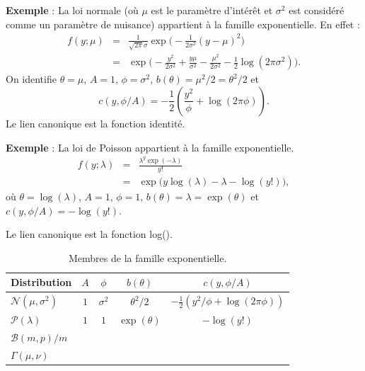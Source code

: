 \documentclass{BeamerTemplate}
\begin{document}
\begin{refsection}
\begin{frame}{}
\textbf{Exemple} : La {\color{blue} loi normale} (où $\mu$ est le
paramètre d'intérêt et $\sigma^2$ est considéré comme un paramètre de
nuisance)  appartient à la famille
exponentielle. En effet :
\begin{eqnarray*}
  f(y; \mu) & = & \frac{1}{\sqrt{2\pi}\sigma} \exp\big(-\frac{1}{2
  \sigma^2}(y-\mu)^2\big)\\
& = & \exp \big( -\frac{y^2}{2 \sigma^2} + \frac{y \mu}{\sigma^2} - \frac{\mu^2}{2 \sigma^2} - \frac{1}{2} \log(2 \pi \sigma^2) \big).
\end{eqnarray*}
On identifie $\theta=\mu$, $A=1$, $\phi=\sigma^ 2$, $b(\theta) = \mu^2/2=
\theta^2/2$ et
$$c(y,\phi/A) = -\frac{1}{2} \left( \frac{y^2}{\phi} + \log(2 \pi \phi) \right).$$
Le lien canonique est la fonction identité.
\end{frame}

\begin{frame}{}

\textbf{Exemple} : La {\color{blue}loi de Poisson} appartient à la
famille exponentielle.
\begin{eqnarray*}
  f(y;\lambda) & = & \frac{\lambda^y \exp(-\lambda)}{y!}\\
& = & \exp \big(y \log(\lambda) - \lambda - \log(y!) \big),
\end{eqnarray*}
où $\theta=\log(\lambda)$, $A=1$, $\phi=1$, $b(\theta) = \lambda = \exp(\theta)$
et $c(y,\phi/A)=-\log(y!)$.

\bigskip
Le lien canonique est la fonction log().
\end{frame}


\begin{frame}{}

\begin{table}[tbp]
  \centering
  \begin{tabular}{|l|c|c|c|c|}
   \hline
  Distribution & $A$ & $\phi$ & $b(\theta)$ & $c(y, \phi/A)$\\
  \hline
   ${\mathcal N}(\mu,\sigma^2)$ & $1$ & $\sigma^2$ &  $\theta^2/2$ & $-\frac{1}{2} (y^2/\phi + \log(2 \pi \phi))$ \\
   ${\mathcal P}(\lambda)$ & $1$ & $1$ & $\exp(\theta)$ & $-\log(y!)$ \\
   ${\mathcal B}(m,p)/m$ & & & & \\
    $\Gamma(\mu,\nu)$ & & & &\\
   \hline
  \end{tabular}
  \caption{Membres de la famille exponentielle.}
  \label{exponential.table}
\end{table}
\end{frame}


\end{refsection}
\end{document}
